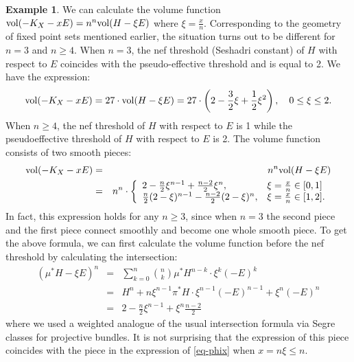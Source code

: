 \documentclass[12pt]{amsart}
\theoremstyle{definition}
\newtheorem{ex}[thm]{Example}
\def\vol{{\rm vol}}
\begin{document}
\begin{ex}
    We can calculate the volume function $\vol(-K_X-x E)=n^n \vol(H-\xi E)$ where $\xi=\frac{x}{n}$. 
    Corresponding to the geometry of fixed point sets mentioned earlier, the situation turns out to be different for $n=3$ and $n\ge 4$. 
    When $n=3$, the nef threshold (Seshadri constant) of $H$ with respect to $E$ coincides with the pseudo-effective threshold and is equal to 2. We have the expression:
    \begin{eqnarray*}
        \vol(-K_X-xE)=27\cdot \vol(H-\xi E)=27\cdot\left(2-\frac{3}{2}\xi+\frac{1}{2}\xi^2\right), \quad 0\le \xi\le 2.
    \end{eqnarray*}
    When $n\ge 4$, the nef threshold of $H$ with respect to $E$ is 1 while the pseudoeffective threshold of $H$ with respect to $E$ is 2. The volume function consists of two smooth pieces:
    \begin{eqnarray}\label{eq-Qvol}
    \vol(-K_X-x E)&=&n^n\vol(H-\xi E)\\
    &=& n^n\cdot 
    \left\{
    \begin{array}{ll}
     2-\frac{n}{2} \xi^{n-1}+\frac{n-2}{2}\xi^n, & \xi=\frac{x}{n}\in [0, 1]\nonumber \\
    \frac{n}{2}(2-\xi)^{n-1}-\frac{n-2}{2}(2-\xi)^n, &  \xi=\frac{x}{n}\in [1,2]. 
    \end{array}
    \right.
\end{eqnarray}
In fact, this expression holds for any $n\ge 3$, since when $n=3$ the second piece and the first piece connect smoothly and become one whole smooth piece. 
To get the above formula, we can first calculate the volume function before the nef threshold by calculating the intersection:
\begin{eqnarray*}
    (\mu^*H-\xi E)^n&=&\sum_{k=0}^{n}\binom{n}{k}\mu^*H^{n-k}\cdot \xi^k (-E)^{k}\\
    &=&H^n+n\xi^{n-1}\pi^*H\cdot \xi^{n-1} (-E)^{n-1}+\xi^n (-E)^n\\
    &=&2-\frac{n}{2}\xi^{n-1}+\xi^n\frac{n-2}{2}
    \end{eqnarray*}
    where we used a weighted analogue of the usual intersection formula via Segre classes for projective bundles. It is not surprising that the expression of this piece coincides with the piece in the expression of \eqref{eq-phix} when $x=n\xi \le n$. 


\end{ex}
\end{document}
